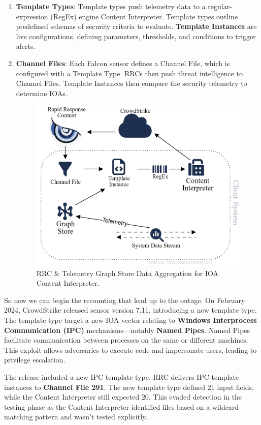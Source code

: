 \begin{enumerate}
    \item \textbf{Template Types}: Template types push telemetry data to a regular-expression (RegEx) engine Content Interpreter. Template types outline predefined schemas of security criteria to evaluate. \textbf{Template Instances}
    are live configurations, defining parameters, thresholds, and conditions to trigger alerts.
    \item \textbf{Channel Files}: Each Falcon sensor defines a Channel File, which is configured with a Template Type. RRCs then push threat intelligence to Channel Files. Template Instances then compare the security telemetry to 
    determine IOAs.
   
    \begin{figure}[h!]
        \centering
        \includegraphics[width=.65\textwidth]{Sections/crowd/rrc.png}
        \caption{RRC \& Telemetry Graph Store Data Aggregation for IOA Content Interpreter.}
        \label{fig:channelfile}
    \end{figure}
\end{enumerate}

\vspace{-1em}
So now we can begin the recounting that lead up to the outage. On February 2024, CrowdStrike released sensor version 7.11, introducing a new template type.
The template type target a new IOA vector relating to \textbf{Windows Interprocess Communication (IPC)} mechanisms---notably \textbf{Named Pipes}.
Named Pipes facilitate communication between processes on the same or different machines. This exploit allows adversaries to execute code and impersonate users, leading to privilege escalation. \cite{sandker_named_pipes_2021}

The release included a new IPC template type. RRC delivers IPC template instances to \textbf{Channel File 291}. The new template type defined 21 input fields, while the Content Interpreter still expected 20. This evaded detection in the testing phase as the Content Interpreter identified files based on a wildcard matching pattern and wasn't tested explicitly.

